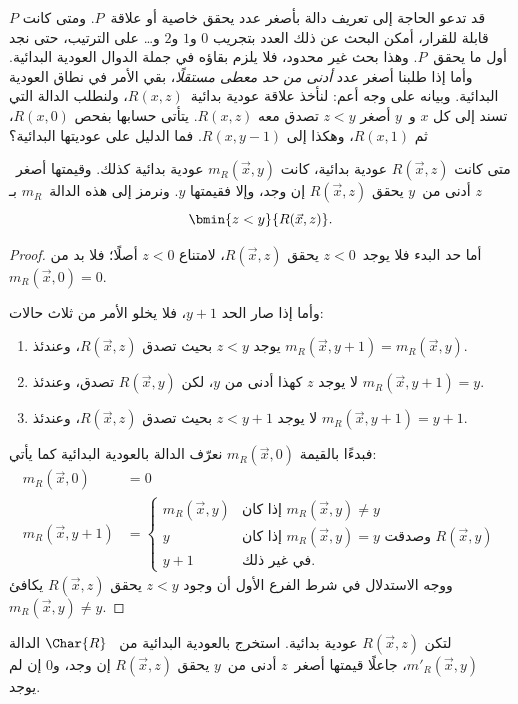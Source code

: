 \documentclass[../../../include/open-logic-section]{subfiles}
\begin{document}

\begin{explain}
قد تدعو الحاجة إلى تعريف دالة بأصغر عدد يحقق خاصية أو
علاقة~$P$. ومتى كانت $P$ قابلة للقرار، أمكن البحث عن ذلك العدد
بتجريب $0$ و$1$ و$2$ و… على الترتيب، حتى نجد أول ما
يحقق~$P$. وهذا بحث غير محدود، فلا يلزم بقاؤه في جملة الدوال
العودية البدائية. وأما إذا طلبنا أصغر عدد
\emph{أدنى من حد معطى مستقلًا}، بقي الأمر في نطاق العودية البدائية.
وبيانه على وجه أعم: لنأخذ علاقة عودية بدائية~$R(x,z)$،
ولنطلب الدالة التي تسند إلى كل $x$ و~$y$ أصغر $z<y$ تصدق معه
$R(x,z)$. يتأتى حسابها بفحص $R(x,0)$، ثم $R(x,1)$، وهكذا إلى
$R(x,y-1)$. فما الدليل على عوديتها البدائية؟
\end{explain}

\begin{prop}
متى كانت $R(\vec x,z)$ عودية بدائية، كانت $m_R(\vec{x},y)$
عودية بدائية كذلك. وقيمتها أصغر~$z$ أدنى من~$y$ يحقق
$R(\vec x,z)$ إن وجد، وإلا فقيمتها $y$. ونرمز إلى هذه الدالة~$m_R$ بـ
\[
\bmin{z < y}{R(\vec{x}, z)}.
\]
\end{prop}

\begin{proof}
أما حد البدء فلا يوجد~$z<0$ يحقق $R(\vec{x},z)$، لامتناع
$z<0$ أصلًا؛ فلا بد من $m_R(\vec x,0)=0$.

وأما إذا صار الحد $y+1$، فلا يخلو الأمر من ثلاث حالات:
\begin{enumerate}
\item يوجد $z<y$ بحيث تصدق $R(\vec{x},z)$، وعندئذ
$m_R(\vec{x},y+1)=m_R(\vec{x},y)$.
\item لا يوجد $z$ كهذا أدنى من $y$، لكن $R(\vec{x},y)$ تصدق، وعندئذ
$m_R(\vec{x},y+1)=y$.
\item لا يوجد $z<y+1$ بحيث تصدق $R(\vec{x},z)$، وعندئذ
$m_R(\vec{x},y+1)=y+1$.
\end{enumerate}
فبدءًا بالقيمة $m_R(\vec x,0)$ نعرّف الدالة بالعودية البدائية كما يأتي:
\begin{align*}
m_R(\vec{x}, 0) & = 0\\
m_R(\vec{x}, y+1) & =
\begin{cases}
m_R(\vec{x}, y) & \text{إذا كان $m_R(\vec x, y) \neq y$}\\
y & \text{إذا كان $m_R(\vec x, y) = y$ وصدقت $R(\vec{x}, y)$}\\
y+1 & \text{في غير ذلك.}
\end{cases}
\end{align*}
ووجه الاستدلال في شرط الفرع الأول أن وجود $z<y$ يحقق $R(\vec x,z)$ يكافئ
$m_R(\vec x,y)\neq y$.
\end{proof}

\begin{prob}
لتكن $R(\vec x,z)$ عودية بدائية. استخرج بالعودية البدائية من
~$\Char{R}$ الدالة $m'_R(\vec{x},y)$، جاعلًا قيمتها أصغر~$z$ أدنى من~$y$
يحقق $R(\vec{x},z)$ إن وجد، و$0$ إن لم يوجد.
\end{prob}
\end{document}
